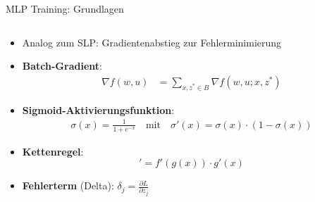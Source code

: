 \documentclass[aspectratio=1610, xcolor=dvipsnames, 9pt]{beamer}
\begin{document}
      \begin{frame}{MLP Training: Grundlagen}
        \begin{columns}
          \begin{column}{1\textwidth}
            \begin{itemize}
              \item Analog zum SLP: Gradientenabstieg zur Fehlerminimierung
              \item \textbf{Batch-Gradient}:
              \begin{align}
                \nabla f(w,u) &= \sum_{x,z^* \in B} \nabla f(w, u; x,z^*)
              \end{align}
              \item \textbf{Sigmoid-Aktivierungsfunktion}:
              \begin{align}
                \sigma(x) = \frac{1}{1+e^{-x}} \quad \text{mit} \quad \sigma'(x) = \sigma(x) \cdot (1 - \sigma(x))
              \end{align}
              \item \textbf{Kettenregel}:
              \begin{equation}
                [f(g(x))]' = f'(g(x)) \cdot g'(x)
              \end{equation}
              \item \textbf{Fehlerterm} (Delta): $\delta_j = \frac{\partial L}{\partial z_j}$
            \end{itemize}
          \end{column}
        \end{columns}
      \end{frame}
\end{document}
